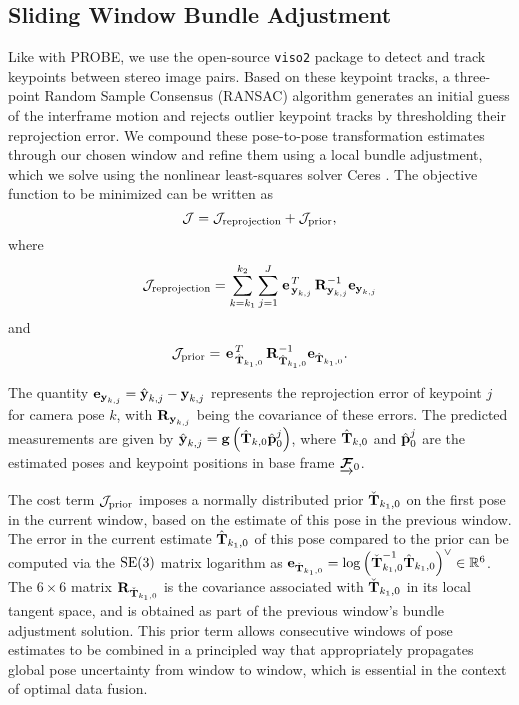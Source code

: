 \subsection{Sliding Window Bundle Adjustment}
Like with PROBE, we use the open-source \texttt{viso2} package \citep{Geiger2011-xe} to detect and track keypoints between stereo image pairs.
Based on these keypoint tracks, a three-point Random Sample Consensus (RANSAC) algorithm \citep{fischler1981random} generates an initial guess of the interframe motion and rejects outlier keypoint tracks by thresholding their reprojection error.
We compound these pose-to-pose transformation estimates through our chosen window and refine them using a local bundle adjustment, which we solve using the nonlinear least-squares solver Ceres \citep{ceres-solver}.
The objective function to be minimized can be written as
\begin{equation} \label{eq:cost_function}
    \mathcal{J} = \mathcal{J}_\text{reprojection} + \mathcal{J}_\text{prior},
\end{equation}
where
\begin{equation} \label{eq:reprojection_cost}
	\mathcal{J}_\text{reprojection} = \sum_{k=k_1}^{k_2} \sum_{j=1}^J \left.{\boldsymbol{\mathbf{e}}}\right.^T_{\boldsymbol{\mathbf{y}}_{k,j}} \boldsymbol{\mathbf{R}}^{-1}_{\boldsymbol{\mathbf{y}}_{k,j}} \boldsymbol{\mathbf{e}}_{\boldsymbol{\mathbf{y}}_{k,j}}
\end{equation}
and 
\begin{equation} \label{eq:prior_cost}
	\mathcal{J}_\text{prior} = \left.{\boldsymbol{\mathbf{e}}}\right.^T_{\hat{\boldsymbol{\mathbf{T}}}_{k_1,0}} \boldsymbol{\mathbf{R}}^{-1}_{\hat{\boldsymbol{\mathbf{T}}}_{k_1,0}} \boldsymbol{\mathbf{e}}_{\hat{\boldsymbol{\mathbf{T}}}_{k_1,0}}.
\end{equation}

The quantity $\boldsymbol{\mathbf{e}}_{\boldsymbol{\mathbf{y}}_{k,j}} = \hat{\boldsymbol{\mathbf{y}}}_{k,j} - \boldsymbol{\mathbf{y}}_{k,j}$ represents the reprojection error of keypoint $j$ for camera pose $k$, with $\boldsymbol{\mathbf{R}}_{\boldsymbol{\mathbf{y}}_{k,j}}$ being the covariance of these errors.
The predicted measurements are given by $\hat{\boldsymbol{\mathbf{y}}}_{k,j} = \boldsymbol{\mathbf{g}}\left(\hat{\boldsymbol{\mathbf{T}}}_{k,0} \hat{\boldsymbol{\mathbf{p}}}^j_{0}\right)$, where $\hat{\boldsymbol{\mathbf{T}}}_{k,0}$ and $\hat{\boldsymbol{\mathbf{p}}}^j_{0}$ are the estimated poses and keypoint positions in base frame $\underrightarrow{ \boldsymbol{\mathbf{\mathcal{F}}} }_{0}$.

The cost term $\mathcal{J}_\text{prior}$ imposes a normally distributed prior $\check{\boldsymbol{\mathbf{T}}}_{k_1,0}$ on the first pose in the current window, based on the estimate of this pose in the previous window.
The error in the current estimate $\hat{\boldsymbol{\mathbf{T}}}_{k_1,0}$ of this pose compared to the prior can be computed via the $\mathrm{SE}(3)$ matrix logarithm as $\boldsymbol{\mathbf{e}}_{\check{\boldsymbol{\mathbf{T}}}_{k_1,0}} = \log \left( \check{\boldsymbol{\mathbf{T}}}_{k_1,0}^{-1} \hat{\boldsymbol{\mathbf{T}}}_{k_1,0} \right)^\vee \in \mathbb{R}^6$.
The $6 \times 6$ matrix $\boldsymbol{\mathbf{R}}_{\check{\boldsymbol{\mathbf{T}}}_{k_1,0}}$ is the covariance associated with $\check{\boldsymbol{\mathbf{T}}}_{k_1,0}$ in its local tangent space, and is obtained as part of the previous window's bundle adjustment solution.
This prior term allows consecutive windows of pose estimates to be combined in a principled way that appropriately propagates global pose uncertainty from window to window, which is essential in the context of optimal data fusion.

